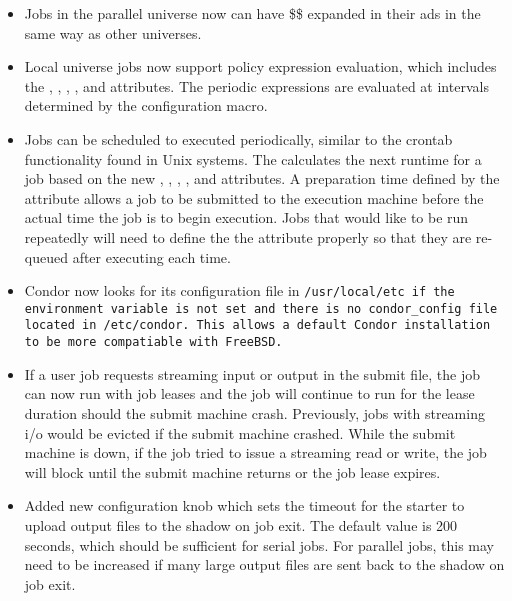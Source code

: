 \begin{itemize}

\item Jobs in the parallel universe now can have \$\$ expanded in their
ads in the same way as other universes.

\item Local universe jobs now support policy expression evaluation, which includes
the , , ,
, and  attributes. The periodic
expressions are evaluated at intervals determined by the
 configuration macro.

\item Jobs can be scheduled to executed periodically, similar to the crontab
functionality found in Unix systems. The  calculates the next
runtime for a job based on the new , ,
, , and
 attributes. A preparation time defined by the
 attribute allows a job to be submitted to the
execution machine before the actual time the job is to begin execution.
Jobs that would like to be run repeatedly will need to define the
the  attribute properly so that they are
re-queued after executing each time.

\item Condor now looks for its configuration file in \tt{/usr/local/etc}
if the  environment variable is not set and there is
no condor\_config file located in \tt{/etc/condor}. This allows a default
Condor installation to be more compatiable with FreeBSD.

\item If a user job requests streaming input or output in the submit
file, the job can now run with job leases and the job will continue
to run for the lease duration should the submit machine crash.  Previously,
jobs with streaming i/o would be evicted if the submit machine crashed.
While the submit machine is down, if the job tried to issue a streaming
read or write, the job will block until the submit machine returns or the
job lease expires.

\item Added new configuration knob 
which sets the timeout for the starter to upload output files to the
shadow on job exit.  The default value is 200 seconds, which should
be sufficient for serial jobs.  For parallel jobs, this may need to
be increased if many large output files are sent back to the shadow
on job exit.


\end{itemize}
